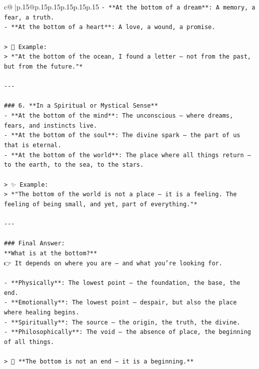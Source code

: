 \documentclass{article}
\begin{document}
{\begin{supertabular}{c@{$\;$}|p{.15\linewidth}@{}p{.15\linewidth}p{.15\linewidth}p{.15\linewidth}p{.15\linewidth}p{.15\linewidth}}
{{{\texttt{{-} **At the bottom of a dream**: A memory, a fear, a truth.} \\
\texttt{{-} **At the bottom of a heart**: A love, a wound, a promise.} \\
\\ 
\texttt{> 🌊 Example:  } \\
\texttt{> *"At the bottom of the ocean, I found a letter — not from the past, but from the future."*} \\
\\ 
\texttt{{-}{-}{-}} \\
\\ 
\texttt{\#\#\# 6. **In a Spiritual or Mystical Sense**} \\
\texttt{{-} **At the bottom of the mind**: The unconscious — where dreams, fears, and instincts live.} \\
\texttt{{-} **At the bottom of the soul**: The divine spark — the part of us that is eternal.} \\
\texttt{{-} **At the bottom of the world**: The place where all things return — to the earth, to the sea, to the stars.} \\
\\ 
\texttt{> ✨ Example:  } \\
\texttt{> *"The bottom of the world is not a place — it is a feeling. The feeling of being small, and yet, part of everything."*} \\
\\ 
\texttt{{-}{-}{-}} \\
\\ 
\texttt{\#\#\# Final Answer:} \\
\texttt{**What is at the bottom?**  } \\
\texttt{👉 It depends on where you are — and what you’re looking for.} \\
\\ 
\texttt{{-} **Physically**: The lowest point — the foundation, the base, the end.} \\
\texttt{{-} **Emotionally**: The lowest point — despair, but also the place where healing begins.} \\
\texttt{{-} **Spiritually**: The source — the origin, the truth, the divine.} \\
\texttt{{-} **Philosophically**: The void — the absence of place, the beginning of all things.} \\
\\ 
\texttt{> 🌊 **The bottom is not an end — it is a beginning.**  } \\
}}}
\end{supertabular}}
\end{document}
